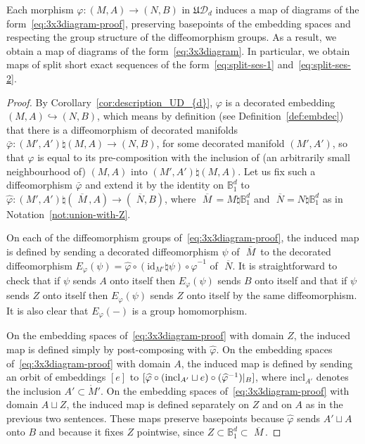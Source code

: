 \documentclass[AHL,Unicode,published]{cedram}
\newcommand{\id}{\mathrm{id}}
\newcommand{\rincl}{\mathrm{incl}}
\newcommand{\Int}{\mathring}
\newcommand{\mbar}{\ensuremath{{\,\,\overline{\!\! M\!}\,}}}
\newcommand{\nbar}{\ensuremath{{\,\,\overline{\!\! N}}}}
\newcommand{\fU}{\ensuremath{\mathfrak{U}}}
\newcommand{\cD}{\mathcal{D}}
\newcommand{\bB}{\mathbb{B}}
\begin{document}
\begin{prop}\label{prop:split-ses-functoriality}
Each morphism $\varphi \colon (M,A) \to (N,B)$ in $\fU\cD_{d}$ induces a map of diagrams of the form~\eqref{eq:3x3diagram-proof}, preserving basepoints of the embedding spaces and respecting the group structure of the diffeomorphism groups. As a result, we obtain a map of diagrams of the form~\eqref{eq:3x3diagram}. In particular, we obtain maps of split short exact sequences of the form~\eqref{eq:split-ses-1} and~\eqref{eq:split-ses-2}.
\end{prop}
\begin{proof}
By Corollary~\ref{cor:description_UD_{d}}, $\varphi$ is a decorated embedding $(M,A) \hookrightarrow (N,B)$, which means by definition (see Definition~\ref{def:embdec}) that there is a diffeomorphism of decorated manifolds $\bar{\varphi} \colon (M',A') \natural (M,A) \to (N,B)$, for some decorated manifold $(M',A')$, so that $\varphi$ is equal to its pre-composition with the inclusion of (an arbitrarily small neighbourhood of) $(M,A)$ into $(M',A') \natural (M,A)$. Let us fix such a diffeomorphism $\bar{\varphi}$ and extend it by the identity on $\bB^d_{1}$ to $\widehat{\varphi} \colon (M',A') \natural (\mbar,A) \to (\nbar,B)$, where $\mbar = M \natural \bB^d_{1}$ and $\nbar = N \natural \bB^d_{1}$ as in Notation~\ref{not:union-with-Z}.

On each of the diffeomorphism groups of~\eqref{eq:3x3diagram-proof}, the induced map is defined by sending a decorated diffeomorphism $\psi$ of $\mbar$ to the decorated diffeomorphism $E_\varphi(\psi) = \widehat{\varphi} \circ (\id_{M'} \natural \psi) \circ \widehat{\varphi}^{-1}$ of $\nbar$. It is straightforward to check that if $\psi$ sends $A$ onto itself then $E_\varphi(\psi)$ sends $B$ onto itself and that if $\psi$ sends $Z$ onto itself then $E_\varphi(\psi)$ sends $Z$ onto itself by the same diffeomorphism. It is also clear that $E_\varphi(-)$ is a group homomorphism.

On the embedding spaces of~\eqref{eq:3x3diagram-proof} with domain $Z$, the induced map is defined simply by post-composing with $\widehat{\varphi}$. On the embedding spaces of~\eqref{eq:3x3diagram-proof} with domain $A$, the induced map is defined by sending an orbit of embeddings $[e]$ to $[\widehat{\varphi} \circ (\rincl_{A'}\linebreak\sqcup e) \circ (\widehat{\varphi}^{-1})|_B]$, where $\rincl_{A'}$ denotes the inclusion $A' \subset \Int{M}'$. On the embedding spaces of~\eqref{eq:3x3diagram-proof} with domain $A \sqcup Z$, the induced map is defined separately on $Z$ and on $A$ as in the previous two sentences. These maps preserve basepoints because $\widehat{\varphi}$ sends $A' \sqcup A$ onto $B$ and because it fixes $Z$ pointwise, since $Z \subset \bB^d_{1} \subset \mbar$.


\end{proof}
\end{document}
